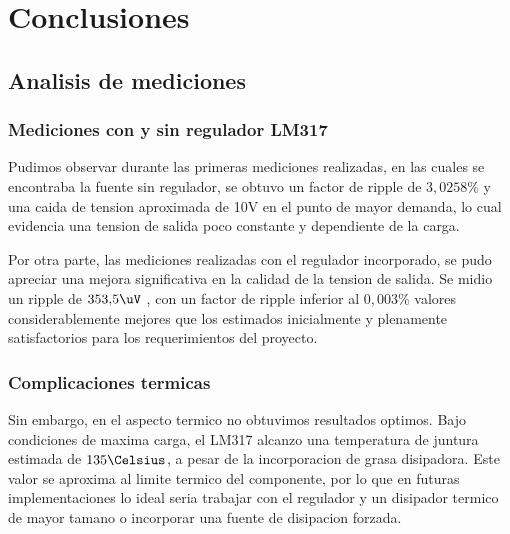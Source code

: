 \chapter{Conclusiones}

\section{Analisis de mediciones}

\subsection{Mediciones con y sin regulador LM317}

Pudimos observar durante las primeras mediciones realizadas, en las cuales se encontraba la fuente sin regulador, se obtuvo un factor de
ripple de $3{,}0258 \percent$ y una caida de tension aproximada de 10V en el punto de mayor demanda, lo cual evidencia una tension de salida poco
constante y dependiente de la carga.

Por otra parte, las mediciones realizadas con el regulador incorporado, se pudo apreciar una mejora significativa en la calidad de la
tension de salida. Se midio un ripple de $353{,}5 \uV$ , con un factor de ripple inferior al $0,003 \percent$ valores considerablemente
mejores que los estimados inicialmente y plenamente satisfactorios para los requerimientos del proyecto.

\subsection{Complicaciones termicas}

Sin embargo, en el aspecto termico no obtuvimos resultados optimos. Bajo condiciones de maxima carga, el LM317 alcanzo una
temperatura de juntura estimada de $135\Celsius$, a pesar de la incorporacion de grasa disipadora. Este valor se aproxima al limite termico del
componente, por lo que en futuras implementaciones lo ideal seria trabajar con el regulador y un disipador termico de mayor tamano o
incorporar una fuente de disipacion forzada.
